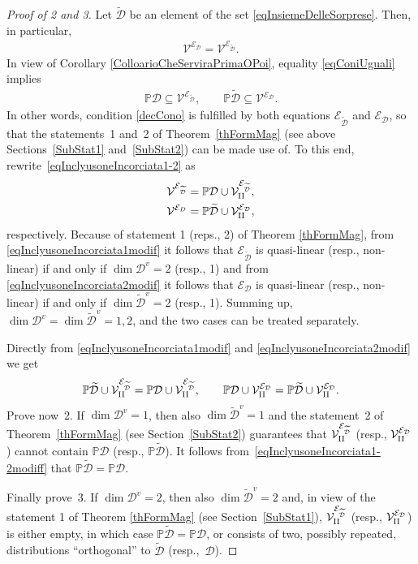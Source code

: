 \documentclass[10pt,a4paper]{amsart}
\newcommand{\D}{\mathcal{D}}
\newcommand{\M}{\mathcal{V}}
\newcommand{\MMM}{\mathcal{V}_{\textrm{\normalfont II}}}
\newcommand{\E}{\mathcal{E}}
\renewcommand{\P}{\mathbb{P}}
\numberwithin{equation}{section}
\begin{document}
\begin{proof}[Proof of 2 and 3]
 Let $\widetilde{\D}$ be an element of the set \eqref{eqInsiemeDelleSorprese}. Then, in particular,
 \begin{gather}\label{eqConiUguali}
\M^{\E_\D}=\M^{\E_{\widetilde{\D}}}.
\end{gather}
In view of Corollary \ref{ColloarioCheServiraPrimaOPoi}, equality \eqref{eqConiUguali} implies
 \begin{gather}\label{eqInclyusoneIncorciata1-2}
\P\D \subseteq \M^{\E_{\widetilde{\D}}},\qquad %
\P\widetilde{\D} \subseteq \M^{\E_{\D}}. %
\end{gather}
In other words, condition \eqref{decCono} is fulf\/illed by both equations $\E_{\widetilde{\D}}$ and $ \E_\D$, so that the statements~1 and~2 of Theorem~\ref{thFormMag} (see above Sections~\ref{SubStat1} and~\ref{SubStat2}) can be made use of. To this end, rewrite~\eqref{eqInclyusoneIncorciata1-2} as
 \begin{gather}
 \M^{\E_{\widetilde{\D}}} = \P\D \cup \MMM^{\E_{\widetilde{\D}}},\label{eqInclyusoneIncorciata1modif}\\
 \M^{\E_{D}} = \P\widetilde{\D} \cup \MMM^{\E_{{\D}}},\label{eqInclyusoneIncorciata2modif}
\end{gather}
respectively.
Because of statement 1 (reps., 2) of Theorem \ref{thFormMag}, from \eqref{eqInclyusoneIncorciata1modif} it follows that $\E_{\widetilde{\D}}$ is quasi-linear (resp., non-linear) if and only if $\dim\D^v=2$ (resp., 1) and from \eqref{eqInclyusoneIncorciata2modif} it follows that $\E_{\D}$ is quasi-linear (resp., non-linear) if and only if $\dim{\widetilde{\D}}^v=2$ (resp., 1). Summing up, $\dim \D^v=\dim\widetilde{\D}^v=1,2 $, and the two cases can be treated separately.

Directly from \eqref{eqInclyusoneIncorciata1modif} and \eqref{eqInclyusoneIncorciata2modif} we get
 \begin{gather}\label{eqInclyusoneIncorciata1-2modiff}
\P\widetilde{\D} \cup \MMM^{\E_{\widetilde{\D}}} = \P\D \cup \MMM^{\E_{\widetilde{\D}}},\qquad %
\P {\D} \cup \MMM^{\E_{ {\D}}} = \P\widetilde{\D} \cup \MMM^{\E_{{\D}}}. %
\end{gather}
Prove now~2. If $\dim \D^v=1$, then also $\dim\widetilde{\D}^v=1$ and the statement~2 of Theorem~\ref{thFormMag} (see
Section~\ref{SubStat2}) guarantees that $\MMM^{\E_{\widetilde{\D}}}$ (resp., $\MMM^{\E_{{\D}}}$) cannot contain $\P\D$ (resp., $\P\widetilde{\D}$). It follows from~\eqref{eqInclyusoneIncorciata1-2modiff} that $\P\widetilde{\D}=\P\D$.

Finally prove~3. If $\dim \D^v=2$, then also $\dim\widetilde{\D}^v=2$ and, in view of the statement 1 of Theorem \ref{thFormMag} (see
Section~\ref{SubStat1}), $\MMM^{\E_{\widetilde{\D}}}$ (resp., $\MMM^{\E_{{\D}}}$) is either empty, in which case $\P\widetilde{\D}=\P\D$, or consists of two, possibly repeated, distributions ``orthogonal'' to $\widetilde{\D}$ (resp.,~$\D$).
\end{proof}
\end{document}
